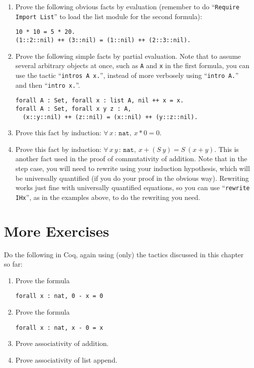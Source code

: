 \documentclass{book}[12pt]
\begin{document}
\begin{enumerate}
\item Prove the following obvious facts by evaluation (remember to do
``\texttt{Require Import List}'' to load the list module for the second
formula):
\begin{verbatim}
10 * 10 = 5 * 20.
(1::2::nil) ++ (3::nil) = (1::nil) ++ (2::3::nil).
\end{verbatim}

\item Prove the following simple facts by partial evaluation.  Note
that to assume several arbitrary objects at once, such as \texttt{A}
and \texttt{x} in the first formula, you can use the tactic
``\texttt{intros A x.}'', instead of more verbosely using
``\texttt{intro A.}'' and then ``\texttt{intro x.}''.
\begin{verbatim}
forall A : Set, forall x : list A, nil ++ x = x.
forall A : Set, forall x y z : A, 
  (x::y::nil) ++ (z::nil) = (x::nil) ++ (y::z::nil).
\end{verbatim}

\item Prove this fact by induction: $\forall\, x\, :\, \texttt{nat},\ x * 0 = 0$.

\item Prove this fact by induction: $\forall\, x\, y\, :\,
\texttt{nat},\ x + (S\ y) = S\ (x + y)$.  This is another fact used in
the proof of commutativity of addition.  Note that in the step case,
you will need to rewrite using your induction hypothesis, which will
be universally quantified (if you do your proof in the obvious way).
Rewriting works just fine with universally quantified equations, so
you can use ``\texttt{rewrite IHx}'', as in the examples above, to do
the rewriting you need.

\end{enumerate}

\section{More Exercises}

Do the following in Coq, again using (only) the tactics discussed in
this chapter so far:

\begin{enumerate}
\item Prove the formula
\begin{verbatim}
forall x : nat, 0 - x = 0
\end{verbatim}
\item Prove the formula
\begin{verbatim}
forall x : nat, x - 0 = x
\end{verbatim}
\item Prove associativity of addition.
\item Prove associativity of list append.
\end{enumerate}
\end{document}
